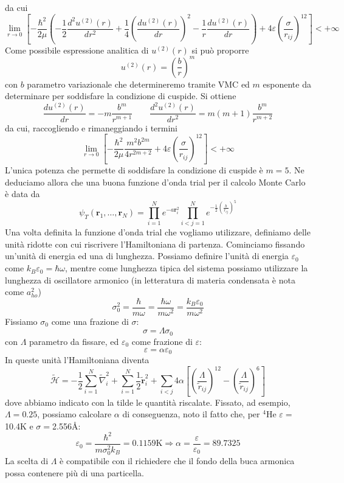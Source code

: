 \documentclass[11pt,a4paper]{article}
\newcommand{\angstrom}{\mbox{\normalfont\AA}}
\begin{document}
da cui
\[
\lim_{r \to 0} \left[ -\frac{\hbar^2}{2\mu}\left( -\frac{1}{2}\frac{d^2u^{(2)}(r)}{dr^2}+\frac{1}{4}\left( \frac{du^{(2)}(r)}{dr}\right)^2 - \frac{1}{r}\frac{du^{(2)}(r)}{dr} \right) +  4\varepsilon\left(\frac{\sigma}{r_{ij}}\right)^{12}\right] < +\infty
\]
Come possibile espressione analitica di $u^{(2)}(r)$ si può proporre
\begin{equation}
u^{(2)}(r) = \left( \frac{b}{r} \right)^m
\end{equation}
con $b$ parametro variazionale che determineremo tramite VMC ed $m$ esponente da determinare per soddisfare la condizione di cuspide. Si ottiene
\[
\frac{du^{(2)}(r)}{dr} = -m\frac{b^m}{r^{m+1}} \qquad \frac{d^2u^{(2)}(r)}{dr^2} = m(m+1)\frac{b^m}{r^{m+2}}
\]
da cui, raccogliendo e rimaneggiando i termini
\begin{equation}
\lim_{r \to 0} \left[ -\frac{\hbar^2}{2\mu}\frac{m^2b^{2m}}{4r^{2m+2}}+4\varepsilon\left(\frac{\sigma}{r_{ij}}\right)^{12} \right] < +\infty
\end{equation}
L'unica potenza che permette di soddisfare la condizione di cuspide è $m=5$. Ne deduciamo allora che una buona funzione d'onda trial per il calcolo Monte Carlo è data da
\begin{equation}
\psi_T(\textbf{r}_1,\ldots,\textbf{r}_N) = \prod_{i=1}^Ne^{ -a\textbf{r}_i^2} \prod_{i<j=1}^N e^{-\frac{1}{2}\left( \frac{b}{r_{ij}} \right)^5}
\end{equation}
Una volta definita la funzione d'onda trial che vogliamo utilizzare, definiamo delle unità ridotte con cui riscrivere l'Hamiltoniana di partenza. Cominciamo fissando un'unità di energia ed una di lunghezza. Possiamo definire l'unità di energia $\varepsilon_0$ come $k_B \varepsilon_0 = \hbar \omega$, mentre come lunghezza tipica del sistema possiamo utilizzare la lunghezza di oscillatore armonico (in letteratura di materia condensata è nota come $a_{ho}^2$) 
\[
\sigma_0^2 = \frac{\hbar}{m\omega} = \frac{\hbar\omega}{m\omega^2} = \frac{k_B\varepsilon_0}{m\omega^2}
\]
Fissiamo $\sigma_0$ come una frazione di $\sigma$:
\begin{equation}
\sigma = \Lambda \sigma_0
\end{equation}
con $\Lambda$ parametro da fissare, ed $\varepsilon_0$ come frazione di $\varepsilon$:
\begin{equation}
\varepsilon = \alpha \varepsilon_0
\end{equation}
In queste unità l'Hamiltoniana diventa
\begin{equation}
\mathcal{\tilde{H}} = -\frac{1}{2}\sum_{i=1}^N \tilde{\nabla}_i^2 + \sum_{i=1}^N\frac{1}{2}\tilde{\textbf{r}}_i^2 + \sum_{i<j}4\alpha \left[ \left(\frac{\Lambda}{\tilde{r}_{ij}}\right)^{12}- \left(\frac{\Lambda}{\tilde{r}_{ij}}\right)^6 \right]
\end{equation}
dove abbiamo indicato con la tilde le quantità riscalate. Fissato, ad esempio, $\Lambda = 0.25$, possiamo calcolare $\alpha$ di conseguenza, noto il fatto che, per $^{4}$He $\varepsilon =$10.4K e $\sigma=$2.556\angstrom: 
\[
\varepsilon_0 = \frac{\hbar^2}{m\sigma_0^2k_B} = 0.1159\text{K} \Rightarrow \alpha = \frac{\varepsilon}{\varepsilon_0} = 89.7325
\]
La scelta di $\Lambda$ è compatibile con il richiedere che il fondo della buca armonica possa contenere più di una particella. 
\end{document}
